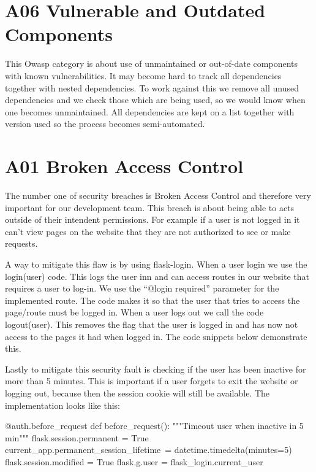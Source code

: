 \section{A06 Vulnerable and Outdated Components}

This Owasp category is about use of unmaintained or out-of-date components with known vulnerabilities. It may become hard to track all dependencies together with nested dependencies.
To work against this we remove all unused dependencies and we check those which are being used, so we would know when one becomes unmaintained. All dependencies are kept on a list together with version used so the process becomes semi-automated.

\section{A01 Broken Access Control}

The number one of security breaches is Broken Access Control and therefore very important for our development team. This breach is about being able to acts outside of their intendent permissions. For example if a user is not logged in it can’t view pages on the website that they are not authorized to see or make requests. 

A way to mitigate this flaw is by using flask-login. When a user login we use the login(user) code. This logs the user inn and can access routes in our website that requires a user to log-in. We use the “@login required” parameter for the implemented route. The code makes it so that the user that tries to access the page/route must be logged in. When a user logs out we call the code logout(user). This removes the flag that the user is logged in and has now not access to the pages it had when logged in. The code snippets below demonstrate this. 

Lastly to mitigate this security fault is checking if the user has been inactive for more than 5 minutes. This is important if a user forgets to exit the website or logging out, because then the session cookie will still be available. The implementation looks like this:

\begin{python}
@auth.before_request
def before_request():
    """Timeout user when inactive in 5 min"""
    flask.session.permanent = True
    current_app.permanent_session_lifetime\
        = datetime.timedelta(minutes=5)
    flask.session.modified = True
    flask.g.user = flask_login.current_user
\end{python}

